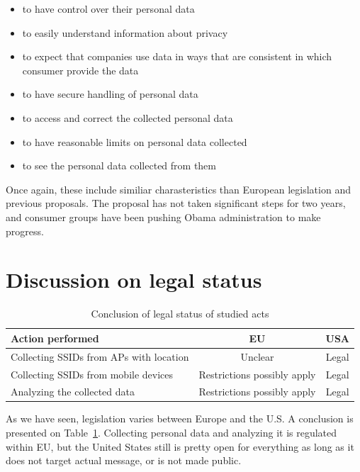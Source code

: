 \documentclass[12pt,a4paper,oneside,pdftex]{report}
\begin{document}
\begin{itemize}
    \item to have control over their personal data
    \item to easily understand information about privacy
    \item to expect that companies use data in ways that are consistent in which consumer provide the data
    \item to have secure handling of personal data
    \item to access and correct the collected personal data
    \item to have reasonable limits on personal data collected
    \item to see the personal data collected from them
\end{itemize}

Once again, these include similiar charasteristics than European legislation and previous proposals. The proposal has not taken significant steps for two years, and consumer groups have been pushing Obama administration to make progress.~\cite{law360_groups}

\section{Discussion on legal status}

\begin{table}
\center
    \begin{tabular}{|l|c|c|}
        \hline
        Action performed & EU & USA \\ \hline
        \hline
        Collecting SSIDs from APs with location & Unclear & Legal \\ 
        \hline
        Collecting SSIDs from mobile devices & Restrictions possibly apply & Legal \\ 
        \hline
        Analyzing the collected data & Restrictions possibly apply & Legal \\ \hline
    \end{tabular}
    \caption{Conclusion of legal status of studied acts}
    \label{table:conclusion}
\end{table}

As we have seen, legislation varies between Europe and the U.S. A conclusion is presented on Table~\ref{table:conclusion}. Collecting personal data and analyzing it is regulated within EU, but the United States still is pretty open for everything as long as it does not target actual message, or is not made public.
\end{document}

